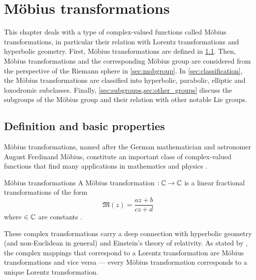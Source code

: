 \chapter{Möbius transformations}
\label{chap:moebius_transforms}
This chapter deals with a type of complex-valued functions called Möbius transformations, in particular their relation with Lorentz transformations and hyperbolic geometry. First, Möbius transformations are defined in \cref{sec:moebius_def}. Then, Möbius transformations and the corresponding Möbius group are considered from the perspective of the Riemann sphere in \cref{sec:mobgroup}. In \cref{sec:classification}, the Möbius transformations are classified into hyperbolic, parabolic, elliptic and loxodromic subclasses. Finally, \cref{sec:subgroups,sec:other_groups} discuss the subgroups of the Möbius group and their relation with other notable Lie groups.

\section{Definition and basic properties}
\label{sec:moebius_def}
Möbius transformations, named after the German mathematician and astronomer August Ferdinand Möbius, constitute an important class of complex-valued functions that find many applications in mathematics and physics \cite{Needham1997}.
\begin{thmblock}{Möbius transformations}
    A Möbius transformation $:\mathbb{C}\to\mathbb{C}$ is a linear fractional transformations of the form 
        \begin{equation}
            \mathfrak{M}(z) = \frac{az + b}{cz + d} \label{eq:mobius}
        \end{equation}
    where  \(\in \mathbb{C} \) are constants \cite{Needham1997}.
\end{thmblock}
These complex transformations carry a deep connection with hyperbolic geometry (and non-Euclidean in general) and Einstein's theory of relativity. As stated by \citet{Needham1997}, the complex mappings that correspond to a Lorentz transformation are Möbius transformations and vice versa --- every Möbius transformation corresponds to a unique Lorentz transformation.

